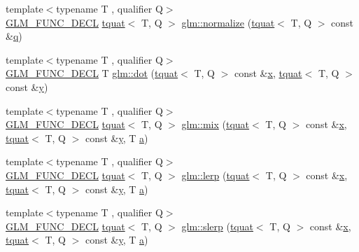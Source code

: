 \begin{DoxyCompactItemize}
{\footnotesize template$<$typename T , qualifier Q$>$ }\\\hyperlink{setup_8hpp_ab2d052de21a70539923e9bcbf6e83a51}{G\+L\+M\+\_\+\+F\+U\+N\+C\+\_\+\+D\+E\+CL} \hyperlink{structglm_1_1tquat}{tquat}$<$ T, Q $>$ \hyperlink{group__gtc__quaternion_gad4f3769e33c18d1897d1857c1f8da864}{glm\+::normalize} (\hyperlink{structglm_1_1tquat}{tquat}$<$ T, Q $>$ const \&\hyperlink{_s_d_l__opengl_8h_a8fc1e7b9baaae687804c7eed46ca09c6}{q})
\item 
{\footnotesize template$<$typename T , qualifier Q$>$ }\\\hyperlink{setup_8hpp_ab2d052de21a70539923e9bcbf6e83a51}{G\+L\+M\+\_\+\+F\+U\+N\+C\+\_\+\+D\+E\+CL} T \hyperlink{group__gtc__quaternion_gab219911644fdc694e7d275cfcf35bfca}{glm\+::dot} (\hyperlink{structglm_1_1tquat}{tquat}$<$ T, Q $>$ const \&\hyperlink{_s_d_l__opengl_8h_ad0e63d0edcdbd3d79554076bf309fd47}{x}, \hyperlink{structglm_1_1tquat}{tquat}$<$ T, Q $>$ const \&\hyperlink{_s_d_l__opengl_8h_a1675d9d7bb68e1657ff028643b4037e3}{y})
\item 
{\footnotesize template$<$typename T , qualifier Q$>$ }\\\hyperlink{setup_8hpp_ab2d052de21a70539923e9bcbf6e83a51}{G\+L\+M\+\_\+\+F\+U\+N\+C\+\_\+\+D\+E\+CL} \hyperlink{structglm_1_1tquat}{tquat}$<$ T, Q $>$ \hyperlink{group__gtc__quaternion_ga6c31ccbb8548b2b24226901e602dfc0a}{glm\+::mix} (\hyperlink{structglm_1_1tquat}{tquat}$<$ T, Q $>$ const \&\hyperlink{_s_d_l__opengl_8h_ad0e63d0edcdbd3d79554076bf309fd47}{x}, \hyperlink{structglm_1_1tquat}{tquat}$<$ T, Q $>$ const \&\hyperlink{_s_d_l__opengl_8h_a1675d9d7bb68e1657ff028643b4037e3}{y}, T \hyperlink{_s_d_l__opengl__glext_8h_a3309789fc188587d666cda5ece79cf82}{a})
\item 
{\footnotesize template$<$typename T , qualifier Q$>$ }\\\hyperlink{setup_8hpp_ab2d052de21a70539923e9bcbf6e83a51}{G\+L\+M\+\_\+\+F\+U\+N\+C\+\_\+\+D\+E\+CL} \hyperlink{structglm_1_1tquat}{tquat}$<$ T, Q $>$ \hyperlink{group__gtc__quaternion_gabc58e7013ef63d6df69c28c14afd0c01}{glm\+::lerp} (\hyperlink{structglm_1_1tquat}{tquat}$<$ T, Q $>$ const \&\hyperlink{_s_d_l__opengl_8h_ad0e63d0edcdbd3d79554076bf309fd47}{x}, \hyperlink{structglm_1_1tquat}{tquat}$<$ T, Q $>$ const \&\hyperlink{_s_d_l__opengl_8h_a1675d9d7bb68e1657ff028643b4037e3}{y}, T \hyperlink{_s_d_l__opengl__glext_8h_a3309789fc188587d666cda5ece79cf82}{a})
\item 
{\footnotesize template$<$typename T , qualifier Q$>$ }\\\hyperlink{setup_8hpp_ab2d052de21a70539923e9bcbf6e83a51}{G\+L\+M\+\_\+\+F\+U\+N\+C\+\_\+\+D\+E\+CL} \hyperlink{structglm_1_1tquat}{tquat}$<$ T, Q $>$ \hyperlink{group__gtc__quaternion_ga3796542dac06014d541d67ebd5f2a88a}{glm\+::slerp} (\hyperlink{structglm_1_1tquat}{tquat}$<$ T, Q $>$ const \&\hyperlink{_s_d_l__opengl_8h_ad0e63d0edcdbd3d79554076bf309fd47}{x}, \hyperlink{structglm_1_1tquat}{tquat}$<$ T, Q $>$ const \&\hyperlink{_s_d_l__opengl_8h_a1675d9d7bb68e1657ff028643b4037e3}{y}, T \hyperlink{_s_d_l__opengl__glext_8h_a3309789fc188587d666cda5ece79cf82}{a})

\end{DoxyCompactItemize}
